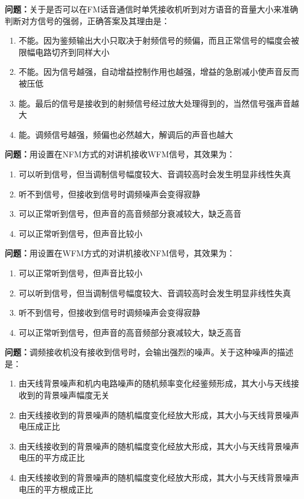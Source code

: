 \documentclass[UTF8]{ctexbook}
\begin{document}
\textbf{问题：}关于是否可以在FM话音通信时单凭接收机听到对方语音的音量大小来准确判断对方信号的强弱，正确答案及其理由是：
\begin{enumerate}[label=\Alph*), leftmargin=3em]
  \item 不能。因为鉴频输出大小只取决于射频信号的频偏，而且正常信号的幅度会被限幅电路切齐到同样大小
  \item 不能。因为信号越强，自动增益控制作用也越强，增益的急剧减小使声音反而被压低
  \item 能。最后的信号是接收到的射频信号经过放大处理得到的，当然信号强声音越大
  \item 能。调频信号越强，频偏也必然越大，解调后的声音也越大
\end{enumerate}

\textbf{问题：}用设置在NFM方式的对讲机接收WFM信号，其效果为：
\begin{enumerate}[label=\Alph*), leftmargin=3em]
  \item 可以听到信号，但当调制信号幅度较大、音调较高时会发生明显非线性失真
  \item 听不到信号，但接收到信号时调频噪声会变得寂静
  \item 可以正常听到信号，但声音的高音频部分衰减较大，缺乏高音
  \item 可以正常听到信号，但声音比较小
\end{enumerate}

\textbf{问题：}用设置在WFM方式的对讲机接收NFM信号，其效果为：
\begin{enumerate}[label=\Alph*), leftmargin=3em]
  \item 可以正常听到信号，但声音比较小
  \item 可以听到信号，但当调制信号幅度较大、音调较高时会发生明显非线性失真
  \item 听不到信号，但接收到信号时调频噪声会变得寂静
  \item 可以正常听到信号，但声音的高音频部分衰减较大，缺乏高音
\end{enumerate}

\textbf{问题：}调频接收机没有接收到信号时，会输出强烈的噪声。关于这种噪声的描述是：
\begin{enumerate}[label=\Alph*), leftmargin=3em]
  \item 由天线背景噪声和机内电路噪声的随机频率变化经鉴频形成，其大小与天线接收到的背景噪声幅度无关
  \item 由天线接收到的背景噪声的随机幅度变化经放大形成，其大小与天线背景噪声电压成正比
  \item 由天线接收到的背景噪声的随机幅度变化经放大形成，其大小与天线背景噪声电压的平方成正比
  \item 由天线接收到的背景噪声的随机幅度变化经放大形成，其大小与天线背景噪声电压的平方根成正比
\end{enumerate}
\end{document}
